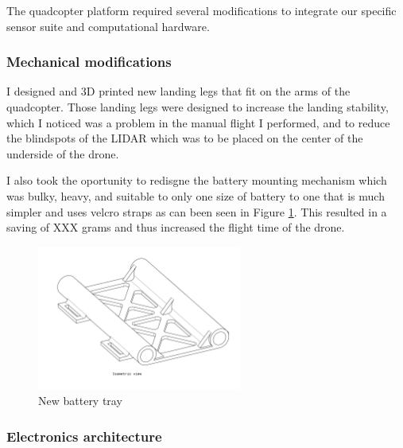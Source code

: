 \documentclass[11pt]{article}
\begin{document}
            The quadcopter platform required several modifications to integrate our specific sensor suite and computational hardware.

            \subsubsection{Mechanical modifications}

                I designed and 3D printed new landing legs that fit on the arms of the quadcopter. Those landing legs were designed to increase the landing stability, which I noticed was a problem in the manual flight I performed, and to reduce the blindspots of the LIDAR which was to be placed on the center of the underside of the drone.

                I also took the oportunity to redisgne the battery mounting mechanism which was bulky, heavy, and suitable to only one size of battery to one that is much simpler and uses velcro straps as can been seen in Figure \ref{fig:landing_legs}. This resulted in a saving of \color{red} XXX grams \color{black} and thus increased the flight time of the drone. 
                

                \begin{figure}[H]
                    \centering
                    \includegraphics[width=0.6\textwidth]{Images/BatteryTrayDrawing.pdf}
                    \caption{New battery tray}
                    \label{fig:landing_legs}
                \end{figure}    
            \subsubsection{Electronics architecture}

\end{document}
